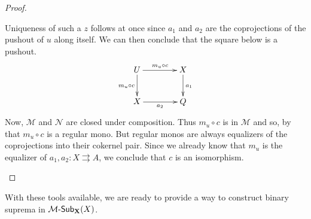 \begin{proof}
\begin{enumerate}
		Uniqueness of such a $z$ follows at once since $a_1$ and $a_2$ are the coprojections of the pushout of $u$ along itself.  We can then conclude that the square below is a pushout.
		\[\xymatrix@C=40pt{U \ar[r]^{m_u\circ c} \ar[d]_{m_u\circ c} & X \ar[d]^{a_1}\\  X\ar[r]_{a_2} &  Q }\]
		Now, $\mathcal{M}$ and $\mathcal{N}$ are closed under composition. Thus $m_u\circ c$ is in $\mathcal{M}$ and so, by  that $m_u\circ c$ is a regular mono. But regular monos are always equalizers of the coprojections into their cokernel pair. Since we already know that $m_u$ is the equalizer of $a_1, a_2\colon X \rightrightarrows A$, we conclude that $c$ is an isomorphism. 	\qedhere 
	\end{enumerate}
\end{proof}
 
With these tools available, we are ready to provide a way to construct binary suprema in ${\mathcal{M}}\textrm{-}\mathsf{Sub}_{\textbf {\textup{\textbf {\textup{X}}}}}(X)$.
 
